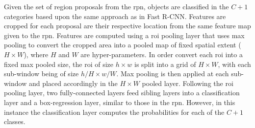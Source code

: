 Given the set of region proposals from the \gls{rpn}, objects are classified in the $C+1$ categories based upon the same approach as in Fast R-CNN. Features are cropped for each proposal are their respective location from the same feature map given to the \gls{rpn}. Features are computed using a \gls{roi} pooling layer that uses max pooling to convert the cropped area into a pooled map of fixed spatial extent ($H \times W$), where $H$ and $W$ are hyper-parameters. In order convert each \gls{roi} into a fixed max pooled size, the \gls{roi} of size $h \times w$ is split into a grid of $H \times W$, with each sub-window being of size $h/H \times w/W$. Max pooling is then applied at each sub-window and placed accordingly in the $H \times W$ pooled layer. Following the \gls{roi} pooling layer, two fully-connected layers feed sibling layers into a classification layer and a box-regression layer, similar to those in the \gls{rpn}. However, in this instance the classification layer computes the probabilities for each of the $C+1$ classes.

